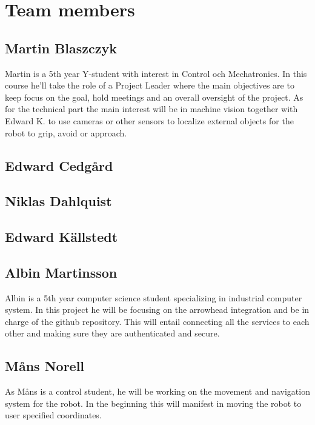 \section{Team members}

\subsection{Martin Blaszczyk}
Martin is a 5th year Y-student with interest in Control och Mechatronics. 
In this course he'll take the role of a Project Leader where the main objectives
are to keep focus on the goal, hold meetings and an overall oversight of the project. 
As for the technical part the main interest will be in machine vision together with
Edward K. to use cameras or other sensors to localize external objects for the 
robot to grip, avoid or approach. 

\subsection{Edward Cedgård}

\subsection{Niklas Dahlquist}

\subsection{Edward Källstedt}

\subsection{Albin Martinsson}
Albin is a 5th year computer science student specializing in industrial computer system. In this project he will be focusing on the 
arrowhead integration and be in charge of the github repository. This will entail connecting all the services to each other and
making sure they are authenticated and secure. 

\subsection{Måns Norell}
As Måns is a control student, he will be working on the movement and navigation system for the robot. In the beginning this will manifest in moving the robot to user specified coordinates.

